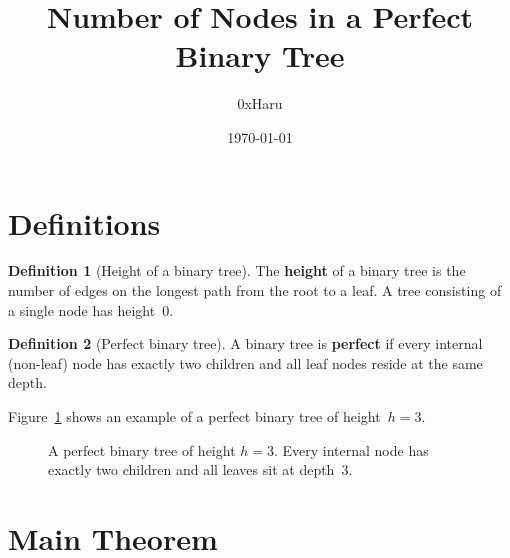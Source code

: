 \documentclass[12pt]{article}
\title{\textbf{Number of Nodes in a Perfect Binary Tree}}
\author{0xHaru}
\date{\today}
\theoremstyle{definition}
\newtheorem{definition}{Definition}
\theoremstyle{plain}
\begin{document}
\maketitle

\section{Definitions}

\begin{definition}[Height of a binary tree]
The \textbf{height} of a binary tree is the number of edges on the
longest path from the root to a leaf.  A tree consisting of a single
node has height~$0$.
\end{definition}

\begin{definition}[Perfect binary tree]
A binary tree is \textbf{perfect} if every internal (non-leaf) node
has exactly two children and all leaf nodes reside at the same depth.
\end{definition}

\noindent
Figure~\ref{fig:perfect} shows an example of a perfect binary tree of
height~$h=3$.

\begin{figure}[H]
\centering
{}
\caption{A perfect binary tree of height $h=3$.  Every internal node
  has exactly two children and all leaves sit at depth~$3$.}
\label{fig:perfect}
\end{figure}

\section{Main Theorem}
\end{document}
